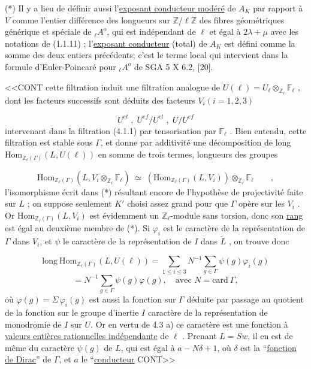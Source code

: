 (*) Il y a lieu de définir aussi l'\underline{exposant conducteur modéré} de $A_K$ par rapport à $V$ comme l'entier différence des longueurs sur $\mathbb{Z}/\ell\mathbb{Z}$ des fibres géométriques générique et spéciale de ${}_\ell A^o$, qui est indépendant de $\ell$ et égal à $2\lambda + \mu$ avec les notations de (1.1.11) ; l'\underline{exposant conducteur} (total) de $A_K$ est défini comme la somme des deux entiers précédents; c'est le terme local qui intervient dans la formule d'Euler-Poincaré pour ${}_\ell A^o$ de SGA 5 X 6.2, [20].



<<CONT cette filtration induit une filtration analogue de $U(\ell) = U_\ell \otimes_{\mathbb{Z}_\ell} \mathbb{F}_\ell$ , dont les facteurs successifs sont déduits des facteurs $V_i(i=1,2,3)$

\begin{equation*}
U^{et} \; , \; U^{ef}/U^{et} \; , \; U/U^{ef}
\end{equation*}
intervenant dans la filtration (4.1.1) par tensorisation par $\mathbb{F}_\ell$ . Bien entendu, cette filtration est stable sous $\Gamma$, et donne par additivité une décomposition de long $\mathrm{Hom}_{\mathbb{Z}_\ell(\Gamma)}(L,U(\ell))$ en somme de trois termes, longueurs des groupes

\begin{equation}\tag{*}
\mathrm{Hom}_{\mathbb{Z}_\ell(\Gamma)}(L,V_i \otimes_{\mathbb{Z}_\ell} \mathbb{F}_\ell) \;\simeq\; (\mathrm{Hom}_{\mathbb{Z}_\ell(\Gamma)}(L,V_i)) \otimes_{\mathbb{Z}_\ell} \mathbb{F}_\ell \qquad ,
\end{equation}
l'isomorphisme écrit dans (*) résultant encore de l'hypothèse de projectivité faite sur $L$ ; on suppose seulement $K'$ choisi assez grand pour que $\Gamma$ opère sur les $V_i$ . Or $\mathrm{Hom}_{\mathbb{Z}_\ell(\Gamma)}(L,V_i)$ est évidemment un $\mathbb{Z}_\ell$-module sans torsion, donc son \underline{rang} est égal au deuxième membre de (*). Si $\varphi_i$ est le caractère de la représentation de $\Gamma$ dans $V_i$, et $\psi$ le caractère de la représentation de $I$ dans $\check{L}$ , on trouve donc

\begin{equation}\tag{4.6.1}
\mathrm{long}\ \mathrm{Hom}_{\mathbb{Z}_\ell(\Gamma)}(L,U(\ell)) = \sum_{1 \leq i \leq 3} N^{-1} \sum_{g \in \Gamma} \psi(g)\varphi_i(g)
\end{equation}
\begin{equation*}
= N^{-1} \sum_{g \in \Gamma} \psi(g)\varphi(g), \quad \mbox{avec } N = \mathrm{card}\ \Gamma,
\end{equation*}
où $\varphi(g) = \Sigma\, \varphi_i(g)$ est aussi la fonction sur $\Gamma$ déduite par passage au quotient de la fonction sur le groupe d'inertie $I$ caractère de la représentation de monodromie de $I$ sur $U$. Or en vertu de 4.3 a) ce caractère est une fonction à \underline{valeurs entières rationnelles indépendante} de $\ell$ . Prenant $L = Sw$, il en est de même du caractère $\psi(g)$ de $L$, qui est égal à $a-N\delta+1$, où $\delta$ est la ``\underline{fonction de Dirac}'' de $\Gamma$, et $a$ le ``\underline{conducteur} CONT>>


